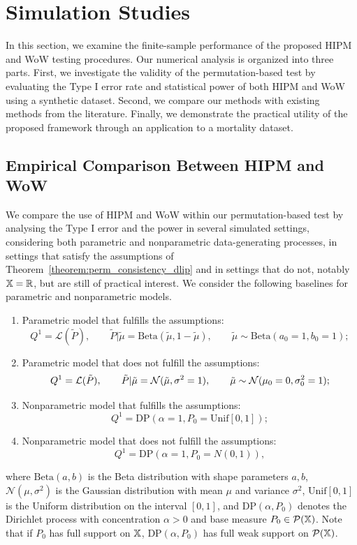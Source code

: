 \section{Simulation Studies}\label{section:simulations}
In this section, we examine the finite-sample performance of the proposed HIPM and WoW testing procedures. Our numerical analysis is organized into three parts. First, we investigate the validity of the permutation-based test by evaluating the Type I error rate and statistical power of both HIPM and WoW using a synthetic dataset. Second, we compare our methods with existing methods from the literature. Finally, we demonstrate the practical utility of the proposed framework through an application to a mortality dataset.

\subsection{Empirical Comparison Between HIPM and WoW}\label{subsection:hipm_wow_comparison}

We compare the use of HIPM and WoW within our permutation-based test by analysing the Type I error and the power in several simulated settings, considering both parametric and nonparametric data-generating processes, in settings that satisfy the assumptions of Theorem~\ref{theorem:perm_consistency_dlip} and in settings that do not, notably $\mathbb{X} = \mathbb{R}$, but are still of practical interest. We consider the following baselines for parametric and nonparametric models.
\begin{enumerate}
\item Parametric model that fulfills the assumptions:
\[
Q^1 = \mathcal{L}(\tilde P), \qquad \tilde P| \tilde \mu = \mathrm{Beta}( \tilde \mu, 1- \tilde \mu), \qquad \tilde \mu \sim \mathrm{Beta}(a_0 = 1, b_0 = 1);
\]
\item Parametric model that does not fulfill the assumptions:
\[
Q^1 = \mathcal{L}(\tilde P), \qquad \tilde P| \tilde \mu = \mathcal{N}(\tilde \mu, \sigma^2 = 1), \qquad \tilde \mu \sim \mathcal{N}(\mu_0 = 0, \sigma^2_0 = 1);
\]

\item Nonparametric model that fulfills the assumptions:
\[
Q^1 = \mathrm{DP}(\alpha = 1, P_0 = \mathrm{Unif}[0,1]);
\]
\item Nonparametric model that does not fulfill the assumptions:
\[
Q^1 = \mathrm{DP}(\alpha = 1, P_0 = N(0,1)),
\]
\end{enumerate}
where $\mathrm{Beta}(a,b)$ is the Beta distribution with shape parameters $a,b$, $\mathcal{N}(\mu, \sigma^2)$ is the Gaussian distribution with mean $\mu$ and variance $\sigma^2$, $\mathrm{Unif}[0,1]$ is the Uniform distribution on the interval $[0,1]$, and $\mathrm{DP}(\alpha, P_0)$ denotes the Dirichlet process with concentration $\alpha>0$ and base measure $P_0 \in \mathcal{P}(\mathbb{X})$. Note that if $P_0$ has full support on $\mathbb{X}$, $\mathrm{DP}(\alpha, P_0)$ has full weak support on $\mathcal{P}(\mathbb{X})$.

